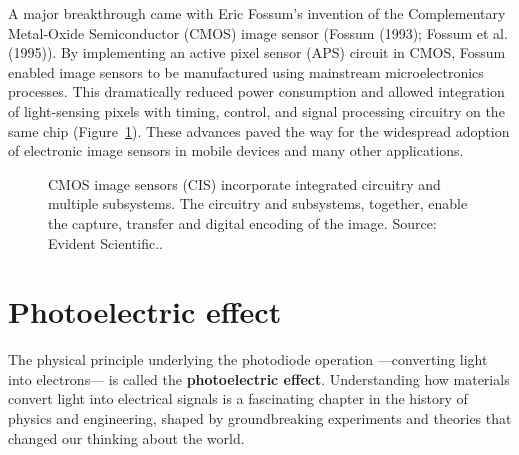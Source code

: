 \documentclass[
  letterpaper,
]{book}
\begin{document}
A major breakthrough came with Eric Fossum's invention of the
Complementary Metal-Oxide Semiconductor (CMOS) image sensor (Fossum
(1993); Fossum et al. (1995)). By implementing an active pixel sensor
(APS) circuit in CMOS, Fossum enabled image sensors to be manufactured
using mainstream microelectronics processes. This dramatically reduced
power consumption and allowed integration of light-sensing pixels with
timing, control, and signal processing circuitry on the same chip
(Figure~\ref{fig-olympus-overview}). These advances paved the way for
the widespread adoption of electronic image sensors in mobile devices
and many other applications.

\begin{figure}


\caption{\label{fig-olympus-overview}CMOS image sensors (CIS)
incorporate integrated circuitry and multiple subsystems. The circuitry
and subsystems, together, enable the capture, transfer and digital
encoding of the image. Source: Evident Scientific..}

\end{figure}%

\section{Photoelectric effect}\label{photoelectric-effect}

The physical principle underlying the photodiode operation ---converting
light into electrons--- is called the \textbf{photoelectric effect}.
Understanding how materials convert light into electrical signals is a
fascinating chapter in the history of physics and engineering, shaped by
groundbreaking experiments and theories that changed our thinking about
the world.
\end{document}
